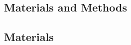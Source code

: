 \begin{refsection}
\chapter{Materials and Methods} %

\label{Chapter2} %



\section{Materials}


\end{refsection}
